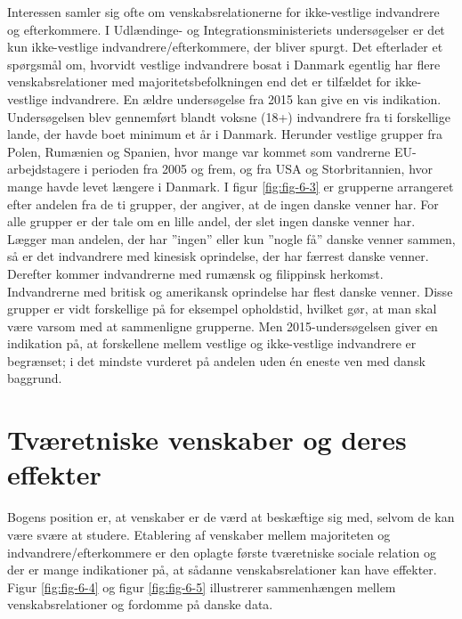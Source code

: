 \documentclass[
]{book}
\begin{document}
Interessen samler sig ofte om venskabsrelationerne for ikke-vestlige indvandrere og efterkommere. I Udlændinge- og Integrationsministeriets undersøgelser er det kun ikke-vestlige indvandrere/efterkommere, der bliver spurgt. Det efterlader et spørgsmål om, hvorvidt vestlige indvandrere bosat i Danmark egentlig har flere venskabsrelationer med majoritetsbefolkningen end det er tilfældet for ikke-vestlige indvandrere. En ældre undersøgelse fra 2015 kan give en vis indikation. Undersøgelsen blev gennemført blandt voksne (18+) indvandrere fra ti forskellige lande, der havde boet minimum et år i Danmark. Herunder vestlige grupper fra Polen, Rumænien og Spanien, hvor mange var kommet som vandrerne EU-arbejdstagere i perioden fra 2005 og frem, og fra USA og Storbritannien, hvor mange havde levet længere i Danmark. I figur \ref{fig:fig-6-3} er grupperne arrangeret efter andelen fra de ti grupper, der angiver, at de ingen danske venner har. For alle grupper er der tale om en lille andel, der slet ingen danske venner har. Lægger man andelen, der har ''ingen'' eller kun ''nogle få'' danske venner sammen, så er det indvandrere med kinesisk oprindelse, der har færrest danske venner. Derefter kommer indvandrerne med rumænsk og filippinsk herkomst. Indvandrerne med britisk og amerikansk oprindelse har flest danske venner. Disse grupper er vidt forskellige på for eksempel opholdstid, hvilket gør, at man skal være varsom med at sammenligne grupperne. Men 2015-undersøgelsen giver en indikation på, at forskellene mellem vestlige og ikke-vestlige indvandrere er begrænset; i det mindste vurderet på andelen uden én eneste ven med dansk baggrund.

\section{Tværetniske venskaber og deres effekter}\label{tvuxe6retniske-venskaber-og-deres-effekter}

Bogens position er, at venskaber er de værd at beskæftige sig med, selvom de kan være svære at studere. Etablering af venskaber mellem majoriteten og indvandrere/efterkommere er den oplagte første tværetniske sociale relation og der er mange indikationer på, at sådanne venskabsrelationer kan have effekter. Figur \ref{fig:fig-6-4} og figur \ref{fig:fig-6-5} illustrerer sammenhængen mellem venskabsrelationer og fordomme på danske data.

\newpage
\end{document}
